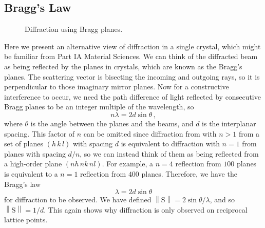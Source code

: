 \documentclass{article}
\theoremstyle{plain}\theoremheaderfont{\normalfont\itshape}\theorembodyfont{\rmfamily}\theoremseparator{.}\newtheorem*{rem}{Remark}\newtheorem*{ex}{Example}\newtheorem*{proof}{Proof}\newtheorem*{altp}{Alternative proof}
\theoremstyle{plain}\theoremheaderfont{\normalfont\bfseries}\theorembodyfont{\rmfamily}\theoremseparator{.}\newtheorem{thm}{Theorem}[section]\newtheorem{lem}[thm]{Lemma}\newtheorem{prop}[thm]{Proposition}\newtheorem*{cor}{Corollary}\newtheorem{defn}[thm]{Definition}\newtheorem{clm}[thm]{Claim}\newtheorem{clminproof}{Claim}\newtheorem*{law}{Law}\newtheorem{pos}[thm]{Postulate}
\theoremstyle{break}\theoremheaderfont{\normalfont\itshape}\theorembodyfont{\rmfamily}\theoremseparator{.\medskip}\newtheorem*{proofskip}{Proof}\newtheorem*{exs}{Examples}\newtheorem*{rems}{Remarks}
\theoremstyle{break}\theoremheaderfont{\normalfont\bfseries}\theorembodyfont{\rmfamily}\theoremseparator{.\medskip}\newtheorem{lemskip}[thm]{Lemma}\newtheorem{defnskip}[thm]{Definition}\newtheorem{propskip}[thm]{Proposition}\newtheorem{thmskip}[thm]{Theorem}
\numberwithin{equation}{section}
\newcommand{\vb}[1]{\bm{\mathrm{#1}}}
\newcommand{\norm}[1]{\left\| #1 \right\|}
\begin{document}
    \subsection{Bragg's Law}
    \begin{figure}
        \centering
        \caption{Diffraction using Bragg planes.}
    \end{figure}
    Here we present an alternative view of diffraction in a single crystal, which might be familiar from Part IA Material Sciences. We can think of the diffracted beam as being reflected by the planes in crystals, which are known as the Bragg's planes. The scattering vector is bisecting the incoming and outgoing rays, so it is perpendicular to those imaginary mirror planes. Now for a constructive interference to occur, we need the path difference of light reflected by consecutive Bragg planes to be an integer multiple of the wavelength, so
    \begin{equation}
        n\lambda=2d\sin\theta\,,
    \end{equation} 
    where \(\theta\) is the angle between the planes and the beams, and \(d\) is the interplanar spacing. This factor of \(n\) can be omitted since diffraction from with \(n>1\) from a set of planes \((h\, k\, l)\) with spacing \(d\) is equivalent to diffraction with \(n=1\) from planes with spacing \(d/n\), so we can instead think of them as being reflected from a high-order plane \((nh\, nk\, nl)\). For example, a \(n=4\) reflection from \(100\) planes is equivalent to a \(n=1\) reflection from \(400\) planes. Therefore, we have the Bragg's law
    \begin{equation}
        \lambda=2d\sin\theta
    \end{equation}
    for diffraction to be observed. We have defined \(\norm{\vb{S}}=2\sin\theta/\lambda\), and so \(\norm{\vb{S}}=1/d\). This again shows why diffraction is only observed on reciprocal lattice points.
\end{document}
